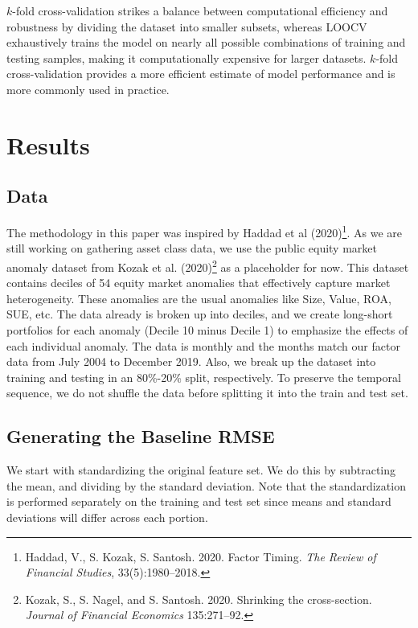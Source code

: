 \documentclass{ledger}
\begin{document}
$k$-fold cross-validation strikes a balance between computational efficiency and robustness by dividing the dataset into smaller subsets, whereas LOOCV exhaustively trains the model on nearly all possible combinations of training and testing samples, making it computationally expensive for larger datasets. $k$-fold cross-validation provides a more efficient estimate of model performance and is more commonly used in practice. \\


\section{Results}

\subsection{Data}

The methodology in this paper was inspired by Haddad et al (2020)\footnote{Haddad, V., S. Kozak, S. Santosh. 2020. Factor Timing. \textit{The Review of Financial Studies}, 33(5):1980–2018.}. As we are still working on gathering asset class data, we use the public equity market anomaly dataset from Kozak et al. (2020)\footnote{Kozak, S., S. Nagel, and S. Santosh. 2020. Shrinking the cross-section. \textit{Journal of Financial Economics} 135:271–92.} as a placeholder for now. This dataset contains deciles of 54 equity market anomalies that effectively capture market heterogeneity. These anomalies are the usual anomalies like Size, Value, ROA, SUE, etc. The data already is broken up into deciles, and we create long-short portfolios for each anomaly (Decile 10 minus Decile 1) to emphasize the effects of each individual anomaly. The data is monthly and the months match our factor data from July 2004 to December 2019. Also, we break up the dataset into training and testing in an 80\%-20\% split, respectively. To preserve the temporal sequence, we do not shuffle the data before splitting it into the train and test set. \\

\subsection{Generating the Baseline RMSE}

We start with standardizing the original feature set. We do this by subtracting the mean, and dividing by the standard deviation. Note that the standardization is performed separately on the training and test set since means and standard deviations will differ across each portion. \\
\end{document}
